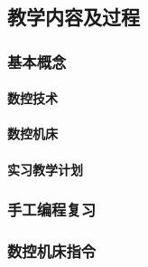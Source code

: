 \subsection{教学内容及过程}
\subsubsection{基本概念} 
\paragraph{数控技术}
\paragraph{数控机床}
\paragraph{实习教学计划}

\subsubsection{手工编程复习} 


\subsubsection{数控机床指令}
